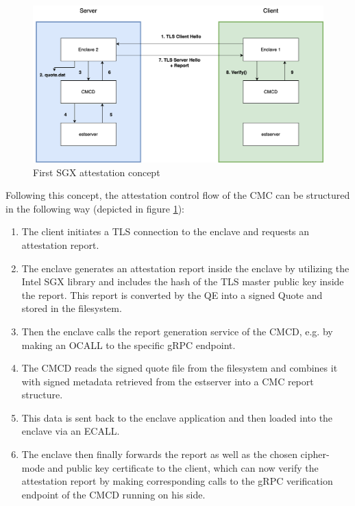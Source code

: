 \begin{figure}
	\begin{center} 
		\includegraphics[width=1.0\linewidth]{figures/cmc-sgx-concept.drawio.png}
	\end{center}
	\caption{First SGX attestation concept}
	\label{sgx-concept-01}
\end{figure}

Following this concept, the attestation control flow of the CMC can be structured in the following way (depicted in figure \ref{sgx-concept-01}):  
\begin{enumerate}
	\item The client initiates a TLS connection to the enclave and requests an attestation report.
	\item The enclave generates an attestation report inside the enclave by utilizing the Intel SGX library and includes the hash of the TLS master public key inside the report. This report is converted by the QE into a signed Quote and stored in the filesystem.
	\item Then the enclave calls the report generation service of the CMCD, e.g. by making an OCALL to the specific gRPC endpoint.
	\item The CMCD reads the signed quote file from the filesystem and combines it with signed metadata retrieved from the estserver into a CMC report structure.
	\item This data is sent back to the enclave application and then loaded into the enclave via an ECALL.
	\item The enclave then finally forwards the report as well as the chosen cipher-mode and public key certificate to the client, which can now verify the attestation report by making corresponding calls to the gRPC verification endpoint of the CMCD running on his side.
\end{enumerate}

